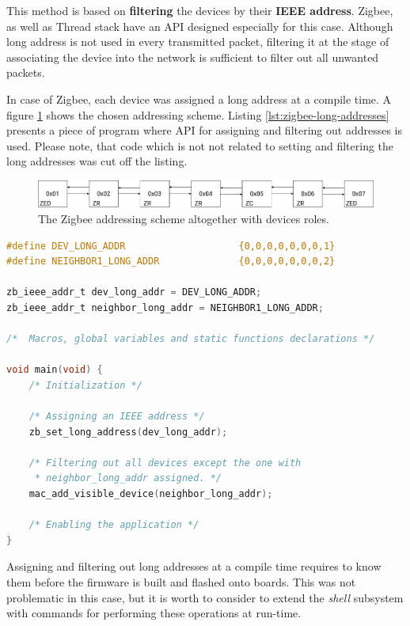 This method is based on  \textbf{filtering} the devices by their \textbf{IEEE address}.
Zigbee, as well as Thread stack have an API designed especially for this case.
Although long address is not used in every transmitted packet, filtering it
at the stage of associating the device into the network is sufficient to filter
out all unwanted packets.

In case of Zigbee, each device was assigned a long address at a compile time.
A figure \ref{fig:long_address} shows the chosen addressing scheme. Listing 
\ref{lst:zigbee-long-addresses} presents a piece of program where API
for assigning and filtering out addresses is used.  Please note, that
code which  is not not related to setting and filtering the long addresses was cut off the listing.

\begin{figure}[H]
    \centering
    \includegraphics[scale=0.32]{images/zigbee-ieee-address.drawio.png}
    \caption{The Zigbee addressing scheme altogether with devices roles.}
    \label{fig:long_address}
\end{figure}

\begin{lstlisting}[language=C, caption={An usage of the ZBOSS API for assigning and filtering long addresses}, label={lst:zigbee-long-addresses}]
#define DEV_LONG_ADDR                    {0,0,0,0,0,0,0,1}
#define NEIGHBOR1_LONG_ADDR              {0,0,0,0,0,0,0,2}

zb_ieee_addr_t dev_long_addr = DEV_LONG_ADDR;
zb_ieee_addr_t neighbor_long_addr = NEIGHBOR1_LONG_ADDR;

/*  Macros, global variables and static functions declarations */

void main(void) {
    /* Initialization */

    /* Assigning an IEEE address */
    zb_set_long_address(dev_long_addr);

    /* Filtering out all devices except the one with
     * neighbor_long_addr assigned. */
    mac_add_visible_device(neighbor_long_addr);

    /* Enabling the application */
}
\end{lstlisting}

Assigning and filtering out long addresses at a compile time requires to know
them before the firmware is built and flashed onto boards. This was not 
problematic in this case, but it is worth to consider to extend the 
\textit{shell} subsystem with commands for performing these operations at 
run-time.

